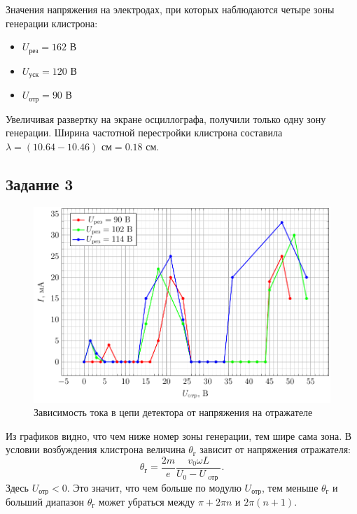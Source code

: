 Значения напряжения на электродах, при которых наблюдаются четыре зоны генерации клистрона:
\begin{itemize}
	\item $U_{\text{рез}}=162$ В
	\item $U_{\text{уск}}=120$ В
	\item $U_{\text{отр}}=90$ В
\end{itemize}

Увеличивая развертку на экране осциллографа, получили только одну зону генерации. Ширина частотной перестройки клистрона составила $\lambda=(10.64-10.46)\text{ см}=0.18$ см.
\subsection{Задание 3}
\begin{figure}[h]
		\centering
		\includegraphics[scale=1]{plots/task3a}
		\caption{Зависимость тока в цепи детектора от напряжения на отражателе}
		\label{fig:task3a}
\end{figure}
Из графиков видно, что чем ниже номер зоны генерации, тем шире сама зона. В условии возбуждения клистрона величина $\theta _ { \text{г} }$ зависит от напряжения отражателя:
\begin{equation*}
\theta _ { \text{г} } = \frac { 2 m } { e } \frac { v _ { 0 } \omega L } { U _ { 0 } - U _ { \text{ oтр } } }.
\end{equation*}
Здесь $U_{\text{отр}}<0$. Это значит, что чем больше по модулю $U_{\text{отр}}$, тем меньше $\theta _ { \text{г} }$ и больший диапазон $\theta _ { \text{г} }$ может убраться между $\pi+ 2\pi n$ и $2\pi(n+1)$.

